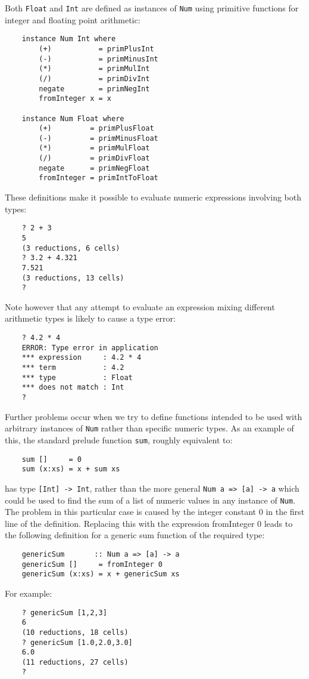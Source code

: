 Both \verb"Float" and \verb"Int" are defined as  
instances  of  \verb"Num"  using  primitive
functions for integer and floating point arithmetic:
\begin{verbatim}
    instance Num Int where
        (+)           = primPlusInt
        (-)           = primMinusInt
        (*)           = primMulInt
        (/)           = primDivInt
        negate        = primNegInt
        fromInteger x = x

    instance Num Float where
        (+)         = primPlusFloat
        (-)         = primMinusFloat
        (*)         = primMulFloat
        (/)         = primDivFloat 
        negate      = primNegFloat
        fromInteger = primIntToFloat
\end{verbatim}
These definitions make it  possible  to  evaluate  numeric  expressions
involving both types:
\begin{verbatim}
    ? 2 + 3
    5
    (3 reductions, 6 cells)
    ? 3.2 + 4.321
    7.521
    (3 reductions, 13 cells)
    ?
\end{verbatim}
Note  however  that  any  attempt  to  evaluate  an  expression  mixing
different arithmetic types is likely to cause a type error:
\begin{verbatim}
    ? 4.2 * 4
    ERROR: Type error in application
    *** expression     : 4.2 * 4
    *** term           : 4.2
    *** type           : Float
    *** does not match : Int
    ?
\end{verbatim}
Further problems occur when we try to define functions intended  to  be
used with arbitrary instances  of  \verb"Num"  rather  than  specific  numeric
types.  As an example of this, the  standard  prelude  function  \verb"sum",
roughly equivalent to:
\begin{verbatim}
    sum []     = 0
    sum (x:xs) = x + sum xs
\end{verbatim}
has type \verb"[Int] -> Int",  
rather than the  more general \verb"Num a => [a] -> a"
which could be used to find the sum of a list of numeric values in  any
instance of \verb"Num".  The problem in this particular case is caused by the
integer constant 0 in the first line of the definition.  Replacing this
with the expression fromInteger 0 leads to the following definition for
a generic sum function of the required type:
\begin{verbatim}
    genericSum       :: Num a => [a] -> a
    genericSum []     = fromInteger 0
    genericSum (x:xs) = x + genericSum xs
\end{verbatim}
For example:
\begin{verbatim}
    ? genericSum [1,2,3]
    6
    (10 reductions, 18 cells)
    ? genericSum [1.0,2.0,3.0]
    6.0
    (11 reductions, 27 cells)
    ?
\end{verbatim}
